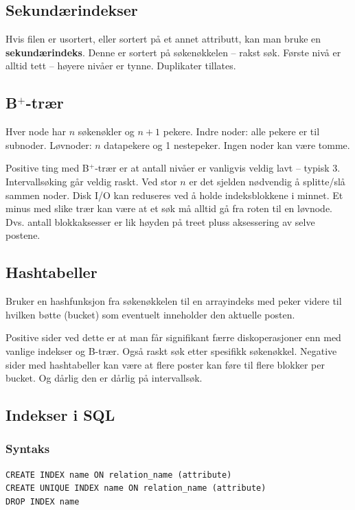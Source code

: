 \documentclass[12pt,a4paper]{article}
\begin{document}
\subsection{Sekundærindekser}
Hvis filen er usortert, eller sortert på et annet attributt, kan man bruke en \textbf{sekundærindeks}. Denne er sortert på søkenøkkelen -- rakst søk. Første nivå er alltid tett -- høyere nivåer er tynne. Duplikater tillates.

\subsection{B$^+$-trær}
Hver node har $n$ søkenøkler og $n+1$ pekere. Indre noder: alle pekere er til subnoder. Løvnoder: $n$ datapekere og 1 nestepeker. Ingen noder kan være tomme.

Positive ting med B$^+$-trær er at antall nivåer er vanligvis veldig lavt -- typisk 3. Intervallsøking går veldig raskt. Ved stor $n$ er det sjelden nødvendig å splitte/slå sammen noder. Disk I/O kan reduseres ved å holde indeksblokkene i minnet. Et minus med slike trær kan være at et søk må alltid gå fra roten til en løvnode. Dvs. antall blokkaksesser er lik høyden på treet pluss aksessering av selve postene.

\subsection{Hashtabeller}
Bruker en hashfunksjon fra søkenøkkelen til en arrayindeks med peker videre til hvilken bøtte (bucket) som eventuelt inneholder den aktuelle posten.

Positive sider ved dette er at man får signifikant færre diskoperasjoner enn med vanlige indekser og B-trær. Også raskt søk etter spesifikk søkenøkkel. Negative sider med hashtabeller kan være at flere poster kan føre til flere blokker per bucket. Og dårlig den er dårlig på intervallsøk.

\subsection{Indekser i SQL}
\subsubsection{Syntaks}
\begin{lstlisting}
CREATE INDEX name ON relation_name (attribute)
CREATE UNIQUE INDEX name ON relation_name (attribute)
DROP INDEX name
\end{lstlisting}
\end{document}
